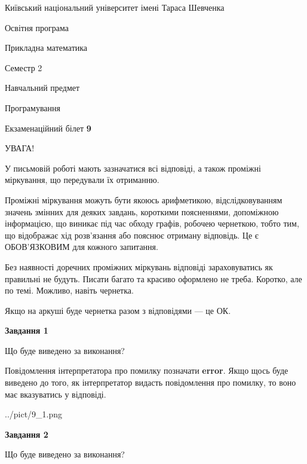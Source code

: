 \documentclass[12pt, ukrainian]{article}
\begin{document}
{{\begin {small}\par
{ \center  Київський національний університет імені Тараса Шевченка \par}
{\parbox {5 cm}{Освітня програма \hfill}{\parbox {7 cm}{Прикладна математика \hfill}}\parbox {6 cm}{\hfill Семестр 2}}\par
{\parbox {5 cm} {Навчальний предмет \hfill}\parbox {7 cm}{Програмування \hfill}\parbox {6cm}{\hfill}\par}\vspace{-7pt} \end{small}}{\center Екзаменаційний білет \No \textbf
{ 9 }\par}}
{
\begin {large}
УВАГА!

У письмовій роботі мають зазначатися всі відповіді, а також проміжні міркування, що передували їх отриманню.

Проміжні міркування можуть бути якоюсь арифметикою, відслідковуванням зна\-чень змінних для деяких завдань,
короткими поясненнями, допоміжною інформацією, що виникає під час обходу графів, робочею чернеткою,
тобто тим, що відображає хід розв’язання або пояснює отриману відповідь.
Це є ОБОВ’ЯЗКОВИМ для кожного запитання.

Без наявності доречних проміжних міркувань відповіді зараховуватись як правиль\-ні не будуть.
Писати багато та красиво оформлено не треба. Коротко, але по темі. Можли\-во, навіть чернетка.

Якщо на аркуші буде чернетка разом з відповідями --- це ОК.

\newpage

{\begin {center}\textbf{Завдання 1}\end {center}}\par
Що буде виведено за виконання?

Повідомлення інтерпретатора про помилку позначати \textbf{error}.
Якщо щось буде виведено до того, як інтерпретатор видасть повідомлення про помилку, 
то воно має вказуватись у відповіді. \par


\begin{center}
	{../pict/9_1.png}
\end{center}
\newpage

{\begin {center}\textbf{Завдання 2}\end {center}}\par
Що буде виведено за виконання?


\end{large}}
\end{document}
